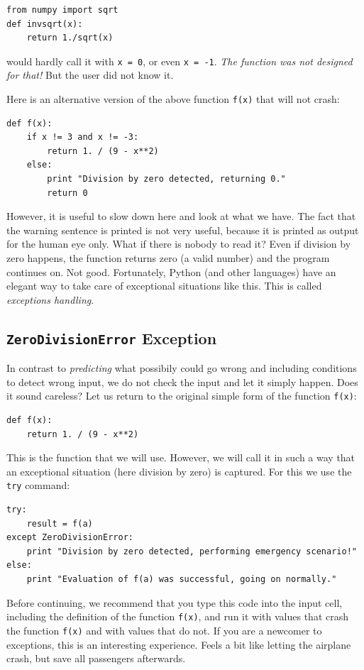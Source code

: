 \begin{verbatim}
from numpy import sqrt
def invsqrt(x):
    return 1./sqrt(x)
\end{verbatim}
would hardly call it with {\tt x = 0}, or even {\tt x = -1}. {\em The function 
was not designed for that!} But the user did not know it.

Here is an alternative version of the above function {\tt f(x)} that will not crash:

\begin{verbatim}
def f(x):
    if x != 3 and x != -3:
        return 1. / (9 - x**2)
    else:
        print "Division by zero detected, returning 0."
        return 0
\end{verbatim}
However, it is useful to slow down here and look at what we have. The fact that
the warning sentence is printed is not very useful, because it is printed as output for 
the human eye only. What if there is nobody to read it? Even if division by zero 
happens, the function returns zero (a valid number) and the program continues on.
Not good. Fortunately,
Python (and other languages) have an elegant way to take care of exceptional situations 
like this. This is called {\em exceptions handling}.

\subsection{{\tt ZeroDivisionError} Exception}

In contrast 
to {\em predicting} what possibily could go wrong and including conditions to detect wrong 
input, we do not check the input and let it simply happen. Does it sound careless? Let us 
return to the original simple form of the function {\tt f(x)}:

\begin{verbatim}
def f(x):
    return 1. / (9 - x**2)
\end{verbatim}
This is the function that we will use. However, we will call it in such a way that 
an exceptional situation (here division by zero) is captured. For this we use the 
{\tt try} command:
 
\begin{verbatim}
try:
    result = f(a)
except ZeroDivisionError:
    print "Division by zero detected, performing emergency scenario!"
else:
    print "Evaluation of f(a) was successful, going on normally."
\end{verbatim}
Before continuing, we recommend that you type this code into the input cell,
including the definition of the function {\tt f(x)}, and run it with values
that crash the function {\tt f(x)} and with values that do not. If you are a newcomer to
exceptions, this is an interesting experience. Feels a bit like letting the
airplane crash, but save all passengers afterwards.
 
